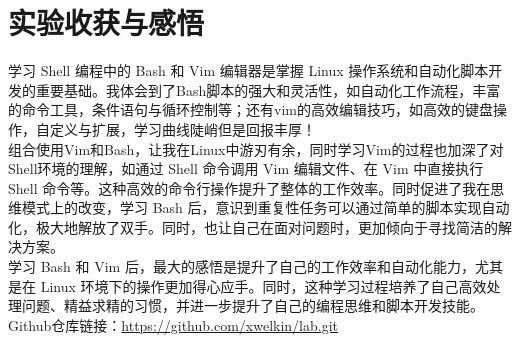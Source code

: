 \documentclass[UTF8,a4paper]{ctexart}
\begin{document}
\begin{sloppypar}
	\section{实验收获与感悟}
	学习 Shell 编程中的 Bash 和 Vim 编辑器是掌握 Linux 操作系统和自动化脚本开发的重要基础。我体会到了Bash脚本的强大和灵活性，如自动化工作流程，丰富的命令工具，条件语句与循环控制等；还有vim的高效编辑技巧，如高效的键盘操作，自定义与扩展，学习曲线陡峭但是回报丰厚！\\
	\indent 组合使用Vim和Bash，让我在Linux中游刃有余，同时学习Vim的过程也加深了对Shell环境的理解，如通过 Shell 命令调用 Vim 编辑文件、在 Vim 中直接执行 Shell 命令等。这种高效的命令行操作提升了整体的工作效率。同时促进了我在思维模式上的改变，学习 Bash 后，意识到重复性任务可以通过简单的脚本实现自动化，极大地解放了双手。同时，也让自己在面对问题时，更加倾向于寻找简洁的解决方案。\\
	\indent 学习 Bash 和 Vim 后，最大的感悟是提升了自己的工作效率和自动化能力，尤其是在 Linux 环境下的操作更加得心应手。同时，这种学习过程培养了自己高效处理问题、精益求精的习惯，并进一步提升了自己的编程思维和脚本开发技能。\\
	
	Github仓库链接：\url{https://github.com/xwelkin/lab.git}
	
\end{sloppypar}
\end{document}
